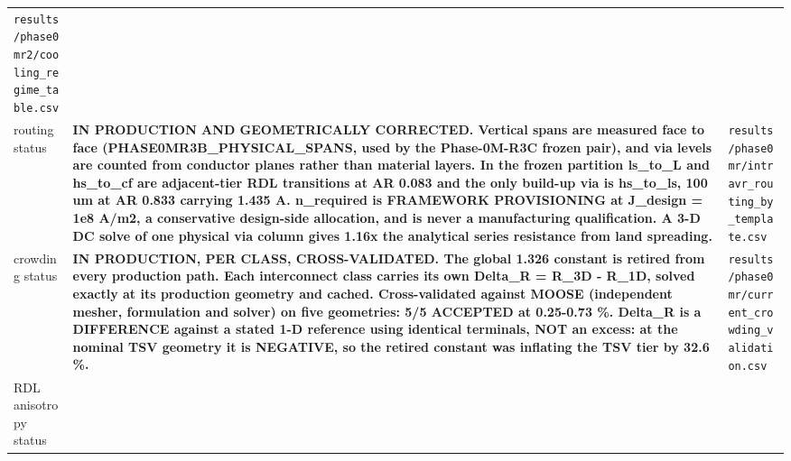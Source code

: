 \documentclass[10pt,]{article}
\begin{document}
\begin{longtable}[]{@{}lll@{}}
\begin{minipage}[t]{0.30\columnwidth}
\texttt{results/phase0mr2/cooling\_regime\_table.csv}\strut
\end{minipage}\tabularnewline
\begin{minipage}[t]{0.30\columnwidth}\raggedright
routing status\strut
\end{minipage} & \begin{minipage}[t]{0.30\columnwidth}\raggedright
\textbf{IN PRODUCTION AND GEOMETRICALLY CORRECTED. Vertical spans are
measured face to face (PHASE0MR3B\_PHYSICAL\_SPANS, used by the
Phase-0M-R3C frozen pair), and via levels are counted from conductor
planes rather than material layers. In the frozen partition ls\_to\_L
and hs\_to\_cf are adjacent-tier RDL transitions at AR 0.083 and the
only build-up via is hs\_to\_ls, 100 um at AR 0.833 carrying 1.435 A.
n\_required is FRAMEWORK PROVISIONING at J\_design = 1e8 A/m2, a
conservative design-side allocation, and is never a manufacturing
qualification. A 3-D DC solve of one physical via column gives 1.16x the
analytical series resistance from land spreading.}\strut
\end{minipage} & \begin{minipage}[t]{0.30\columnwidth}\raggedright
\texttt{results/phase0mr/intravr\_routing\_by\_template.csv}\strut
\end{minipage}\tabularnewline
\begin{minipage}[t]{0.30\columnwidth}\raggedright
crowding status\strut
\end{minipage} & \begin{minipage}[t]{0.30\columnwidth}\raggedright
\textbf{IN PRODUCTION, PER CLASS, CROSS-VALIDATED. The global 1.326
constant is retired from every production path. Each interconnect class
carries its own Delta\_R = R\_3D - R\_1D, solved exactly at its
production geometry and cached. Cross-validated against MOOSE
(independent mesher, formulation and solver) on five geometries: 5/5
ACCEPTED at 0.25-0.73 \%. Delta\_R is a DIFFERENCE against a stated 1-D
reference using identical terminals, NOT an excess: at the nominal TSV
geometry it is NEGATIVE, so the retired constant was inflating the TSV
tier by 32.6 \%.}\strut
\end{minipage} & \begin{minipage}[t]{0.30\columnwidth}\raggedright
\texttt{results/phase0mr/current\_crowding\_validation.csv}\strut
\end{minipage}\tabularnewline
\begin{minipage}[t]{0.30\columnwidth}\raggedright
RDL anisotropy status\strut
\end{minipage} & \begin{minipage}[t]{0.30\columnwidth}\raggedright

\end{minipage}
\end{longtable}
\end{document}
